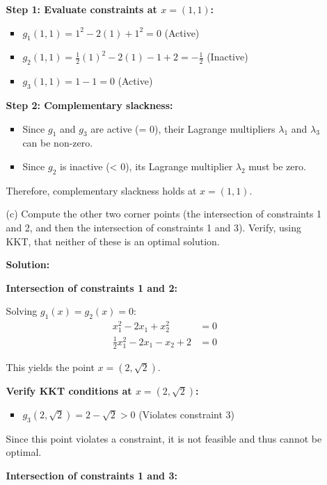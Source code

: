 \documentclass{article}
\begin{document}
\begin{enumerate}
\begin{enumerate}
    \textbf{Step 1: Evaluate constraints at $x = (1, 1)$:}
    \begin{itemize}
    \item $g_1(1, 1) = 1^2 - 2(1) + 1^2 = 0$ (Active)
    \item $g_2(1, 1) = \frac{1}{2}(1)^2 - 2(1) - 1 + 2 = -\frac{1}{2}$ (Inactive)
    \item $g_3(1, 1) = 1 - 1 = 0$ (Active)
    \end{itemize}
    
    \textbf{Step 2: Complementary slackness:}
    \begin{itemize}
    \item Since $g_1$ and $g_3$ are active (= 0), their Lagrange multipliers $\lambda_1$ and $\lambda_3$ can be non-zero.
    \item Since $g_2$ is inactive (< 0), its Lagrange multiplier $\lambda_2$ must be zero.
    \end{itemize}
    
    Therefore, complementary slackness holds at $x = (1, 1)$.
    
    \item[(c)] Compute the other two corner points (the intersection of constraints 1 and 2, and then the intersection of constraints 1 and 3). Verify, using KKT, that neither of these is an optimal solution.
    
    \textbf{Solution:}
    
    \textbf{Intersection of constraints 1 and 2:}
    
    Solving $g_1(x) = g_2(x) = 0$:
    \begin{align*}
    x_1^2 - 2x_1 + x_2^2 &= 0 \\
    \frac{1}{2}x_1^2 - 2x_1 - x_2 + 2 &= 0
    \end{align*}
    
    This yields the point $x = (2, \sqrt{2})$.
    
    \textbf{Verify KKT conditions at $x = (2, \sqrt{2})$:}
    
    \begin{itemize}
    \item $g_3(2, \sqrt{2}) = 2 - \sqrt{2} > 0$ (Violates constraint 3)
    \end{itemize}
    
    Since this point violates a constraint, it is not feasible and thus cannot be optimal.
    
    \textbf{Intersection of constraints 1 and 3:}
    

\end{enumerate}
\end{enumerate}
\end{document}
